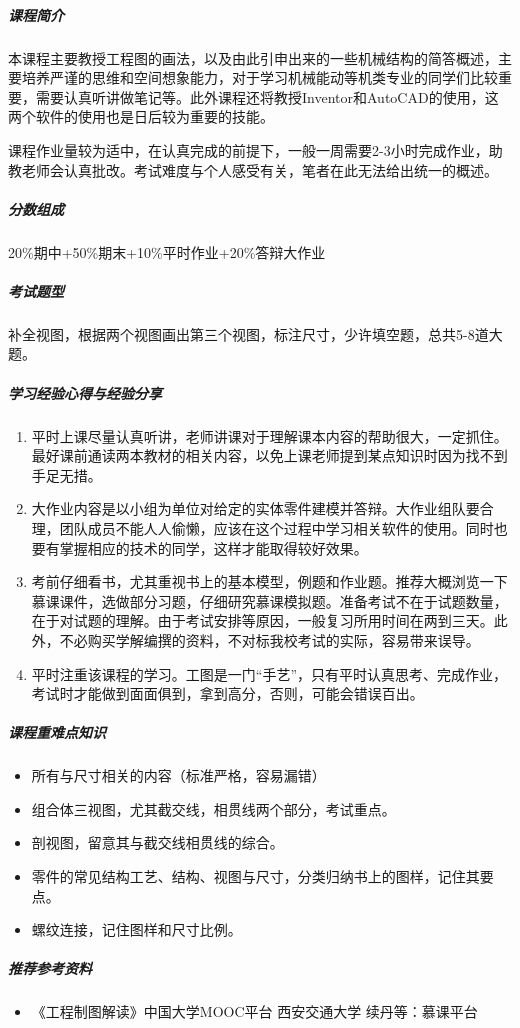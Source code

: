 \documentclass[
decoration,  %
]{qyxf-book}
\begin{document}
\subparagraph{课程简介}
本课程主要教授工程图的画法，以及由此引申出来的一些机械结构的简答概述，主要培养严谨的思维和空间想象能力，对于学习机械能动等机类专业的同学们比较重要，需要认真听讲做笔记等。此外课程还将教授Inventor和AutoCAD的使用，这两个软件的使用也是日后较为重要的技能。
\par\setlength\parindent{2em} 课程作业量较为适中，在认真完成的前提下，一般一周需要2-3小时完成作业，助教老师会认真批改。考试难度与个人感受有关，笔者在此无法给出统一的概述。

\subparagraph{分数组成}
20\%期中+50\%期末+10\%平时作业+20\%答辩大作业

\subparagraph{考试题型}
补全视图，根据两个视图画出第三个视图，标注尺寸，少许填空题，总共5-8道大题。

\subparagraph{学习经验心得与经验分享}
\begin{enumerate}
	\item 平时上课尽量认真听讲，老师讲课对于理解课本内容的帮助很大，一定抓住。最好课前通读两本教材的相关内容，以免上课老师提到某点知识时因为找不到手足无措。
	\item 大作业内容是以小组为单位对给定的实体零件建模并答辩。大作业组队要合理，团队成员不能人人偷懒，应该在这个过程中学习相关软件的使用。同时也要有掌握相应的技术的同学，这样才能取得较好效果。
	\item 考前仔细看书，尤其重视书上的基本模型，例题和作业题。推荐大概浏览一下慕课课件，选做部分习题，仔细研究慕课模拟题。准备考试不在于试题数量，在于对试题的理解。由于考试安排等原因，一般复习所用时间在两到三天。此外，不必购买学解编撰的资料，不对标我校考试的实际，容易带来误导。
	\item 平时注重该课程的学习。工图是一门“手艺”，只有平时认真思考、完成作业，考试时才能做到面面俱到，拿到高分，否则，可能会错误百出。
\end{enumerate}

\subparagraph{课程重难点知识}
\begin{itemize}
	\item 所有与尺寸相关的内容（标准严格，容易漏错）
	\item 组合体三视图，尤其截交线，相贯线两个部分，考试重点。
	\item 剖视图，留意其与截交线相贯线的综合。
	\item 零件的常见结构工艺、结构、视图与尺寸，分类归纳书上的图样，记住其要点。
	\item 螺纹连接，记住图样和尺寸比例。
\end{itemize}

\subparagraph{推荐参考资料}
\begin{itemize}
	\item 《工程制图解读》中国大学MOOC平台 西安交通大学 续丹等：慕课平台
\end{itemize}
\end{document}
